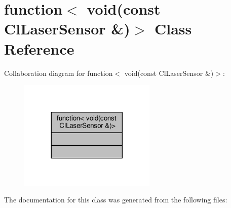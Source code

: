 \hypertarget{classstd_1_1function_3_01void_07const_01ClLaserSensor_01_6_08_4}{}\section{function$<$ void(const Cl\+Laser\+Sensor \&)$>$ Class Reference}
\label{classstd_1_1function_3_01void_07const_01ClLaserSensor_01_6_08_4}


Collaboration diagram for function$<$ void(const Cl\+Laser\+Sensor \&)$>$\+:\nopagebreak
\begin{figure}[H]
\begin{center}
\leavevmode
\includegraphics[width=185pt]{classstd_1_1function_3_01void_07const_01ClLaserSensor_01_6_08_4__coll__graph}
\end{center}
\end{figure}


The documentation for this class was generated from the following files\+: